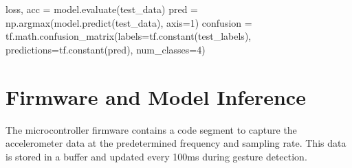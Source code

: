 \documentclass[
  9pt,
  letterpaper,
  abstract,
  titlepage]{scrbook}
\newenvironment{Shaded}{\begin{snugshade}}{\end{snugshade}}
\newcommand{\DecValTok}[1]{\textcolor[rgb]{0.68,0.00,0.00}{#1}}
\newcommand{\NormalTok}[1]{\textcolor[rgb]{0.00,0.23,0.31}{#1}}
\newcommand{\OperatorTok}[1]{\textcolor[rgb]{0.37,0.37,0.37}{#1}}
\begin{document}
\begin{Shaded}
\begin{Highlighting}[]
\NormalTok{loss}\OperatorTok{,}\NormalTok{ acc }\OperatorTok{=}\NormalTok{ model}\OperatorTok{.}\NormalTok{evaluate}\OperatorTok{(}\NormalTok{test\_data}\OperatorTok{)}
\NormalTok{pred }\OperatorTok{=}\NormalTok{ np}\OperatorTok{.}\NormalTok{argmax}\OperatorTok{(}\NormalTok{model}\OperatorTok{.}\NormalTok{predict}\OperatorTok{(}\NormalTok{test\_data}\OperatorTok{),}\NormalTok{ axis}\OperatorTok{=}\DecValTok{1}\OperatorTok{)}
\NormalTok{confusion }\OperatorTok{=}\NormalTok{ tf}\OperatorTok{.}\NormalTok{math}\OperatorTok{.}\NormalTok{confusion\_matrix}\OperatorTok{(}\NormalTok{labels}\OperatorTok{=}\NormalTok{tf}\OperatorTok{.}\NormalTok{constant}\OperatorTok{(}\NormalTok{test\_labels}\OperatorTok{),}
\NormalTok{                                     predictions}\OperatorTok{=}\NormalTok{tf}\OperatorTok{.}\NormalTok{constant}\OperatorTok{(}\NormalTok{pred}\OperatorTok{),}
\NormalTok{                                     num\_classes}\OperatorTok{=}\DecValTok{4}\OperatorTok{)}
\end{Highlighting}
\end{Shaded}

\section{Firmware and Model
Inference}\label{firmware-and-model-inference}

The microcontroller firmware contains a code segment to capture the
accelerometer data at the predetermined frequency and sampling rate.
This data is stored in a buffer and updated every 100ms during gesture
detection.
\end{document}
